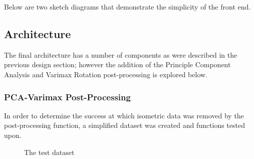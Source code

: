 \documentclass[a4paper,11pt,titlepage]{article}
\begin{document}
	Below are two sketch diagrams that demonstrate the simplicity of the front end.
	
		\begin{figure}[H]
    			\centering	
    			\qquad
    			\caption{}%
    			\label{fig:pca_varimax}
	\end{figure}
	
	\subsection{Architecture}
	The final architecture has a number of components as were described in the previous design section; however the addition of the Principle Component Analysis and Varimax Rotation post-processing is explored below. 
	\par 
	
	\subsubsection{PCA-Varimax Post-Processing}
	In order to determine the success at which isometric data was removed by the post-processing function, a simplified dataset was created and functions tested upon.
	\par 
		
	\begin{figure}[H]
    			\caption{The test dataset}%
	\end{figure}	
	
\end{document}
